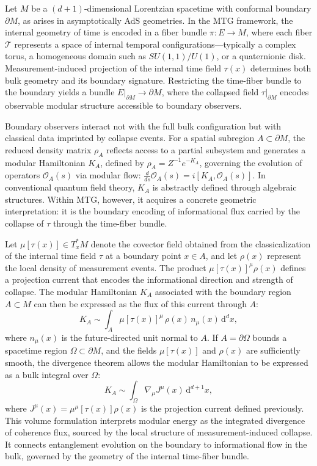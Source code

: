 \documentclass[11pt]{article}
\begin{document}
Let \( M \) be a \((d+1)\)-dimensional Lorentzian spacetime with conformal boundary \( \partial M \), as arises in asymptotically AdS geometries. In the MTG framework, the internal geometry of time is encoded in a fiber bundle \( \pi: E \to M \), where each fiber \( \mathcal{T} \) represents a space of internal temporal configurations—typically a complex torus, a homogeneous domain such as \( SU(1,1)/U(1) \), or a quaternionic disk. Measurement-induced projection of the internal time field \( \tau(x) \) determines both bulk geometry and its boundary signature. Restricting the time-fiber bundle to the boundary yields a bundle \( E|_{\partial M} \to \partial M \), where the collapsed field \( \tau|_{\partial M} \) encodes observable modular structure accessible to boundary observers.

Boundary observers interact not with the full bulk configuration but with classical data imprinted by collapse events. For a spatial subregion \( A \subset \partial M \), the reduced density matrix \( \rho_A \) reflects access to a partial subsystem and generates a modular Hamiltonian \( K_A \), defined by \( \rho_A = Z^{-1} e^{-K_A} \), governing the evolution of operators \( \mathcal{O}_A(s) \) via modular flow: \( \frac{d}{ds} \mathcal{O}_A(s) = i[K_A, \mathcal{O}_A(s)] \). In conventional quantum field theory, \( K_A \) is abstractly defined through algebraic structures. Within MTG, however, it acquires a concrete geometric interpretation: it is the boundary encoding of informational flux carried by the collapse of \( \tau \) through the time-fiber bundle.

Let \( \mu[\tau(x)] \in T^*_x M \) denote the covector field obtained from the classicalization of the internal time field \( \tau \) at a boundary point \( x \in A \), and let \( \rho(x) \) represent the local density of measurement events. The product \( \mu[\tau(x)]^\mu \rho(x) \) defines a projection current that encodes the informational direction and strength of collapse. The modular Hamiltonian \( K_A \) associated with the boundary region \( A \subset M \) can then be expressed as the flux of this current through \( A \):
\begin{equation}
K_A \sim \int_A \mu[\tau(x)]^\mu \, \rho(x) \, n_\mu(x) \, \mathrm{d}^d x,
\end{equation}
where \( n_\mu(x) \) is the future-directed unit normal to \( A \).  If \( A = \partial \Omega \) bounds a spacetime region \( \Omega \subset \partial M \), and the fields \( \mu[\tau(x)] \) and \( \rho(x) \) are sufficiently smooth, the divergence theorem allows the modular Hamiltonian to be expressed as a bulk integral over \( \Omega \):
\begin{equation}
K_A \sim \int_\Omega \nabla_\mu J^\mu(x) \, \mathrm{d}^{d+1}x,
\end{equation}
where \( J^\mu(x) = \mu^\mu[\tau(x)] \rho(x) \) is the projection current defined previously. This volume formulation interprets modular energy as the integrated divergence of coherence flux, sourced by the local structure of measurement-induced collapse. It connects entanglement evolution on the boundary to informational flow in the bulk, governed by the geometry of the internal time-fiber bundle.
\end{document}
